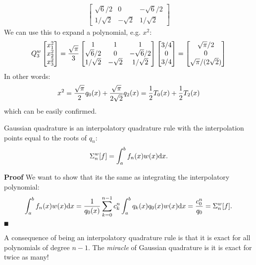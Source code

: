 \begin{example}
\begin{align*}
\begin{bmatrix}
                                \sqrt{6}/2 & 0 & -\sqrt{6}/2 \\
                                1/\sqrt{2} &-\sqrt{2} & 1/\sqrt{2}
                                \end{bmatrix}
\end{align*}
We can use this to expand a polynomial, e.g. $x^2$:
\[
Q_3^w \begin{bmatrix}
x_1^2 \\
x_2^2 \\
x_3^2 
\end{bmatrix} = {\sqrt{\ensuremath{\pi}} \over 3} 
\begin{bmatrix} 1 & 1 & 1 \\
\sqrt{6}/2 & 0 & -\sqrt{6}/2 \\
1/\sqrt{2} &-\sqrt{2} & 1/\sqrt{2}
\end{bmatrix} 
\begin{bmatrix} 3/4 \\ 0 \\ 3/4 \end{bmatrix} =
\begin{bmatrix}
{\sqrt{\ensuremath{\pi}} / 2} \\
0 \\
{\sqrt{\ensuremath{\pi}} / (2\sqrt{2})}
\end{bmatrix}
\]
In other words:
\[
x^2 = {\sqrt \ensuremath{\pi} \over 2} q_0(x) + {\sqrt \ensuremath{\pi} \over 2\sqrt 2} q_2(x) = {1 \over 2} T_0(x) + {1 \over 2} T_2(x)
\]
which can be easily confirmed. \end{example}

\begin{corollary} Gaussian quadrature is an interpolatory quadrature rule with the interpolation points equal to the roots of $q_n$:
\[
\ensuremath{\Sigma}_n^w[f] = \ensuremath{\int}_a^b f_n(x) w(x) {\rm d}x.
\]
\end{corollary}
\textbf{Proof} We want to show that its the same as integrating the interpolatory polynomial:
\[
\int_a^b f_n(x) w(x) {\rm d}x = {1 \over q_0(x)} \sum_{k=0}^{n-1} c_k^n \int_a^b q_k(x) q_0(x) w(x) {\rm d}x
= {c_0^n \over q_0} = \ensuremath{\Sigma}_n^w[f].
\]
\ensuremath{\QED}

A consequence of being an interpolatory quadrature rule is that it is exact for all polynomials of degree $n-1$. The \emph{miracle} of Gaussian quadrature is it is exact for twice as many!

